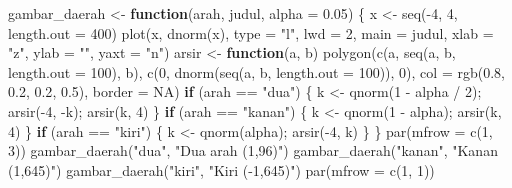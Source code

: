 \documentclass[
  indonesian,
  letterpaper,
]{book}
\newenvironment{Shaded}{\begin{snugshade}}{\end{snugshade}}
\newcommand{\AttributeTok}[1]{\textcolor[rgb]{0.40,0.45,0.13}{#1}}
\newcommand{\ConstantTok}[1]{\textcolor[rgb]{0.56,0.35,0.01}{#1}}
\newcommand{\ControlFlowTok}[1]{\textcolor[rgb]{0.00,0.23,0.31}{\textbf{#1}}}
\newcommand{\DecValTok}[1]{\textcolor[rgb]{0.68,0.00,0.00}{#1}}
\newcommand{\FloatTok}[1]{\textcolor[rgb]{0.68,0.00,0.00}{#1}}
\newcommand{\FunctionTok}[1]{\textcolor[rgb]{0.28,0.35,0.67}{#1}}
\newcommand{\NormalTok}[1]{\textcolor[rgb]{0.00,0.23,0.31}{#1}}
\newcommand{\OtherTok}[1]{\textcolor[rgb]{0.00,0.23,0.31}{#1}}
\newcommand{\SpecialCharTok}[1]{\textcolor[rgb]{0.37,0.37,0.37}{#1}}
\newcommand{\StringTok}[1]{\textcolor[rgb]{0.13,0.47,0.30}{#1}}
\begin{document}
\begin{Shaded}
\begin{Highlighting}[]
\NormalTok{gambar\_daerah }\OtherTok{\textless{}{-}} \ControlFlowTok{function}\NormalTok{(arah, judul, }\AttributeTok{alpha =} \FloatTok{0.05}\NormalTok{) \{}
\NormalTok{  x }\OtherTok{\textless{}{-}} \FunctionTok{seq}\NormalTok{(}\SpecialCharTok{{-}}\DecValTok{4}\NormalTok{, }\DecValTok{4}\NormalTok{, }\AttributeTok{length.out =} \DecValTok{400}\NormalTok{)}
  \FunctionTok{plot}\NormalTok{(x, }\FunctionTok{dnorm}\NormalTok{(x), }\AttributeTok{type =} \StringTok{"l"}\NormalTok{, }\AttributeTok{lwd =} \DecValTok{2}\NormalTok{, }\AttributeTok{main =}\NormalTok{ judul, }\AttributeTok{xlab =} \StringTok{"z"}\NormalTok{, }\AttributeTok{ylab =} \StringTok{""}\NormalTok{, }\AttributeTok{yaxt =} \StringTok{"n"}\NormalTok{)}
\NormalTok{  arsir }\OtherTok{\textless{}{-}} \ControlFlowTok{function}\NormalTok{(a, b) }\FunctionTok{polygon}\NormalTok{(}\FunctionTok{c}\NormalTok{(a, }\FunctionTok{seq}\NormalTok{(a, b, }\AttributeTok{length.out =} \DecValTok{100}\NormalTok{), b),}
                                  \FunctionTok{c}\NormalTok{(}\DecValTok{0}\NormalTok{, }\FunctionTok{dnorm}\NormalTok{(}\FunctionTok{seq}\NormalTok{(a, b, }\AttributeTok{length.out =} \DecValTok{100}\NormalTok{)), }\DecValTok{0}\NormalTok{),}
                                  \AttributeTok{col =} \FunctionTok{rgb}\NormalTok{(}\FloatTok{0.8}\NormalTok{, }\FloatTok{0.2}\NormalTok{, }\FloatTok{0.2}\NormalTok{, }\FloatTok{0.5}\NormalTok{), }\AttributeTok{border =} \ConstantTok{NA}\NormalTok{)}
  \ControlFlowTok{if}\NormalTok{ (arah }\SpecialCharTok{==} \StringTok{"dua"}\NormalTok{)   \{ k }\OtherTok{\textless{}{-}} \FunctionTok{qnorm}\NormalTok{(}\DecValTok{1} \SpecialCharTok{{-}}\NormalTok{ alpha }\SpecialCharTok{/} \DecValTok{2}\NormalTok{); }\FunctionTok{arsir}\NormalTok{(}\SpecialCharTok{{-}}\DecValTok{4}\NormalTok{, }\SpecialCharTok{{-}}\NormalTok{k); }\FunctionTok{arsir}\NormalTok{(k, }\DecValTok{4}\NormalTok{) \}}
  \ControlFlowTok{if}\NormalTok{ (arah }\SpecialCharTok{==} \StringTok{"kanan"}\NormalTok{) \{ k }\OtherTok{\textless{}{-}} \FunctionTok{qnorm}\NormalTok{(}\DecValTok{1} \SpecialCharTok{{-}}\NormalTok{ alpha); }\FunctionTok{arsir}\NormalTok{(k, }\DecValTok{4}\NormalTok{) \}}
  \ControlFlowTok{if}\NormalTok{ (arah }\SpecialCharTok{==} \StringTok{"kiri"}\NormalTok{)  \{ k }\OtherTok{\textless{}{-}} \FunctionTok{qnorm}\NormalTok{(alpha); }\FunctionTok{arsir}\NormalTok{(}\SpecialCharTok{{-}}\DecValTok{4}\NormalTok{, k) \}}
\NormalTok{\}}
\FunctionTok{par}\NormalTok{(}\AttributeTok{mfrow =} \FunctionTok{c}\NormalTok{(}\DecValTok{1}\NormalTok{, }\DecValTok{3}\NormalTok{))}
\FunctionTok{gambar\_daerah}\NormalTok{(}\StringTok{"dua"}\NormalTok{,   }\StringTok{"Dua arah (1,96)"}\NormalTok{)}
\FunctionTok{gambar\_daerah}\NormalTok{(}\StringTok{"kanan"}\NormalTok{, }\StringTok{"Kanan (1,645)"}\NormalTok{)}
\FunctionTok{gambar\_daerah}\NormalTok{(}\StringTok{"kiri"}\NormalTok{,  }\StringTok{"Kiri ({-}1,645)"}\NormalTok{)}
\FunctionTok{par}\NormalTok{(}\AttributeTok{mfrow =} \FunctionTok{c}\NormalTok{(}\DecValTok{1}\NormalTok{, }\DecValTok{1}\NormalTok{))}
\end{Highlighting}
\end{Shaded}
\end{document}
